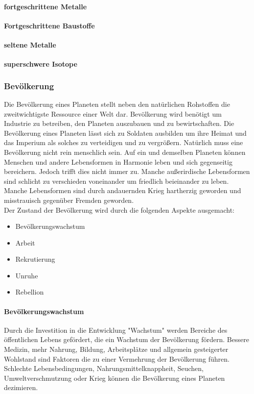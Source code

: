 \documentclass[11pt, a4paper]{article}
\begin{document}
\paragraph{fortgeschrittene Metalle}
%
\paragraph{Fortgeschrittene Baustoffe}
%
\paragraph{seltene Metalle}
%
\paragraph{superschwere Isotope}
%
\subsubsection{Bevölkerung}
Die Bevölkerung eines Planeten stellt neben den natürlichen Rohstoffen die zweitwichtigste Ressource einer Welt
dar. Bevölkerung wird benötigt um Industrie zu betreiben, den Planeten auszubauen und zu bewirtschaften.
Die Bevölkerung eines Planeten lässt sich zu Soldaten ausbilden um ihre Heimat und das Imperium als solches
zu verteidigen und zu vergrößern. Natürlich muss eine Bevölkerung nicht rein menschlich sein. Auf ein und
demselben Planeten können Menschen und andere Lebensformen in Harmonie leben und sich gegenseitig bereichern.
Jedoch trifft dies nicht immer zu. Manche außerirdische Lebensformen sind schlicht zu verschieden voneinander
um friedlich beieinander zu leben. Manche Lebensformen sind durch andauernden Krieg hartherzig geworden und
misstrauisch gegenüber Fremden geworden.\\
Der Zustand der Bevölkerung wird durch die folgenden Aspekte ausgemacht:
\begin{itemize}
	\item Bevölkerungswachstum
	\item Arbeit
	\item Rekrutierung
	\item Unruhe
	\item Rebellion
\end{itemize}
%
\paragraph{Bevölkerungswachstum}
Durch die Investition in die Entwicklung "Wachstum" werden Bereiche des öffentlichen Lebens gefördert, die
ein Wachstum der Bevölkerung fördern. Bessere Medizin, mehr Nahrung, Bildung, Arbeitsplätze und allgemein
gesteigerter Wohlstand sind Faktoren die zu einer Vermehrung der Bevölkerung führen.
Schlechte Lebensbedingungen, Nahrungsmittelknappheit, Seuchen, Umweltverschmutzung oder Krieg können die
Bevölkerung eines Planeten dezimieren.
%
\end{document}
